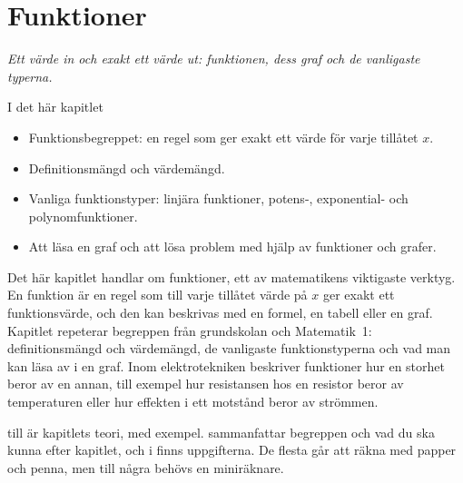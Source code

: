 
\chapter{Funktioner}
\label{c8:ch}

{\large\itshape Ett värde in och exakt ett värde ut: funktionen, dess graf och de vanligaste
typerna.\par}

\begin{chapterbox}{I det här kapitlet}
\begin{itemize}
  \item Funktionsbegreppet: en regel som ger exakt ett värde för varje tillåtet $x$.
  \item Definitionsmängd och värdemängd.
  \item Vanliga funktionstyper: linjära funktioner, potens-, exponential- och polynomfunktioner.
  \item Att läsa en graf och att lösa problem med hjälp av funktioner och grafer.
\end{itemize}
\end{chapterbox}

Det här kapitlet handlar om funktioner, ett av matematikens viktigaste verktyg. En funktion är en
regel som till varje tillåtet värde på $x$ ger exakt ett funktionsvärde, och den kan beskrivas med
en formel, en tabell eller en graf. Kapitlet repeterar begreppen från grundskolan och Matematik~1:
definitionsmängd och värdemängd, de vanligaste funktionstyperna och vad man kan läsa av i en graf.
Inom elektrotekniken beskriver funktioner hur en storhet beror av en annan, till exempel hur
resistansen hos en resistor beror av temperaturen eller hur effekten i ett motstånd beror av
strömmen.

 till  är kapitlets teori, med exempel.
 sammanfattar begreppen och vad du ska kunna efter kapitlet, och i
 finns uppgifterna. De flesta går att räkna med papper och penna, men till
några behövs en miniräknare.




